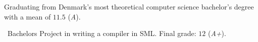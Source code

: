 Graduating from Denmark's most theoretical computer science bachelor's degree with a mean of $11.5$ (\emph{A}).

\medskip

\faFileO\ Bachelors Project in writing a compiler in SML. Final grade: $12$ (\emph{A+}).
